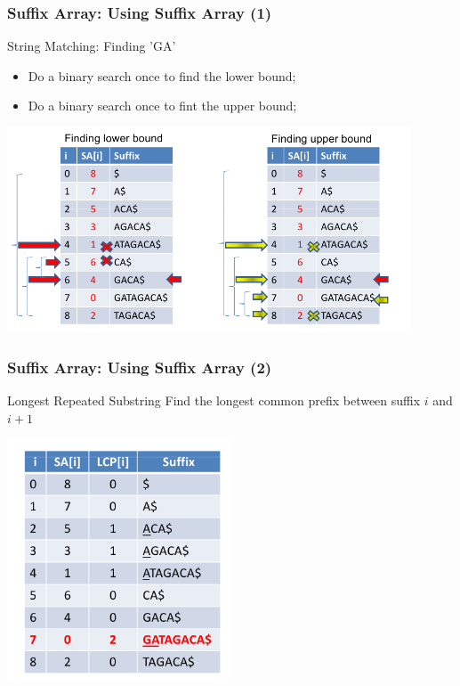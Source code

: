 \begin{frame}
  \frametitle{Suffix Array: Using Suffix Array (1)}
  {\smaller
    \begin{block}{String Matching: Finding 'GA'}
      \begin{itemize}
      \item Do a binary search once to find the lower bound;
      \item Do a binary search once to fint the upper bound;
      \end{itemize}
    \end{block}
    \begin{center}
      \includegraphics[width=0.9\textwidth]{../img/suffixarray_halim}
    \end{center}
  }
\end{frame}

\begin{frame}
    \frametitle{Suffix Array: Using Suffix Array (2)}
  {\smaller
    \begin{block}{Longest Repeated Substring}
      Find the longest common prefix between suffix $i$ and $i+1$
    \end{block}
    \begin{center}
      \includegraphics[width=0.5\textwidth]{../img/suffixarray2_halim}
    \end{center}
  }
\end{frame}

